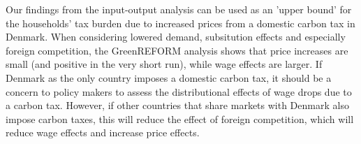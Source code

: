 Our findings from the input-output analysis can be used as an 'upper bound' for the households' tax burden due to increased prices from a domestic carbon tax in Denmark. When considering lowered demand, subsitution effects and especially foreign competition, the GreenREFORM analysis shows that price increases are small (and positive in the very short run), while wage effects are larger. If Denmark as the only country imposes a domestic carbon tax, it should be a concern to policy makers to assess the distributional effects of wage drops due to a carbon tax. However, if other countries that share markets with Denmark also impose carbon taxes, this will reduce the effect of foreign competition, which will reduce wage effects and increase price effects. 



 



